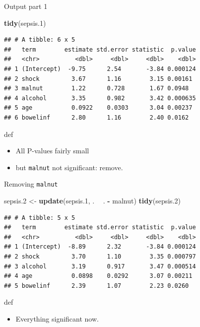 \documentclass[ignorenonframetext,]{beamer}
\newenvironment{Shaded}{\begin{snugshade}}{\end{snugshade}}
\newcommand{\FloatTok}[1]{\textcolor[rgb]{0.00,0.00,0.81}{#1}}
\newcommand{\KeywordTok}[1]{\textcolor[rgb]{0.13,0.29,0.53}{\textbf{#1}}}
\newcommand{\NormalTok}[1]{#1}
\newcommand{\OperatorTok}[1]{\textcolor[rgb]{0.81,0.36,0.00}{\textbf{#1}}}
\newcommand{\StringTok}[1]{\textcolor[rgb]{0.31,0.60,0.02}{#1}}
\providecommand{\tightlist}{%
  \setlength{\itemsep}{0pt}\setlength{\parskip}{0pt}}
\begin{document}
\begin{frame}[fragile]{Output part 1}
\protect\hypertarget{output-part-1}{}

\begin{Shaded}
\begin{Highlighting}[]
\KeywordTok{tidy}\NormalTok{(sepsis}\FloatTok{.1}\NormalTok{)}
\end{Highlighting}
\end{Shaded}

\begin{verbatim}
## # A tibble: 6 x 5
##   term        estimate std.error statistic  p.value
##   <chr>          <dbl>     <dbl>     <dbl>    <dbl>
## 1 (Intercept)  -9.75      2.54       -3.84 0.000124
## 2 shock         3.67      1.16        3.15 0.00161 
## 3 malnut        1.22      0.728       1.67 0.0948  
## 4 alcohol       3.35      0.982       3.42 0.000635
## 5 age           0.0922    0.0303      3.04 0.00237 
## 6 bowelinf      2.80      1.16        2.40 0.0162
\end{verbatim}

def

\begin{itemize}
\item
  All P-values fairly small
\item
  but \texttt{malnut} not significant: remove.
\end{itemize}

\end{frame}

\begin{frame}[fragile]{Removing \texttt{malnut}}
\protect\hypertarget{removing-malnut}{}

\begin{Shaded}
\begin{Highlighting}[]
\NormalTok{sepsis}\FloatTok{.2}\NormalTok{ <-}\StringTok{ }\KeywordTok{update}\NormalTok{(sepsis}\FloatTok{.1}\NormalTok{, . }\OperatorTok{~}\StringTok{ }\NormalTok{. }\OperatorTok{-}\StringTok{ }\NormalTok{malnut)}
\KeywordTok{tidy}\NormalTok{(sepsis}\FloatTok{.2}\NormalTok{)}
\end{Highlighting}
\end{Shaded}

\begin{verbatim}
## # A tibble: 5 x 5
##   term        estimate std.error statistic  p.value
##   <chr>          <dbl>     <dbl>     <dbl>    <dbl>
## 1 (Intercept)  -8.89      2.32       -3.84 0.000124
## 2 shock         3.70      1.10        3.35 0.000797
## 3 alcohol       3.19      0.917       3.47 0.000514
## 4 age           0.0898    0.0292      3.07 0.00211 
## 5 bowelinf      2.39      1.07        2.23 0.0260
\end{verbatim}

def

\begin{itemize}
\tightlist
\item
  Everything significant now.
\end{itemize}

\end{frame}
\end{document}
